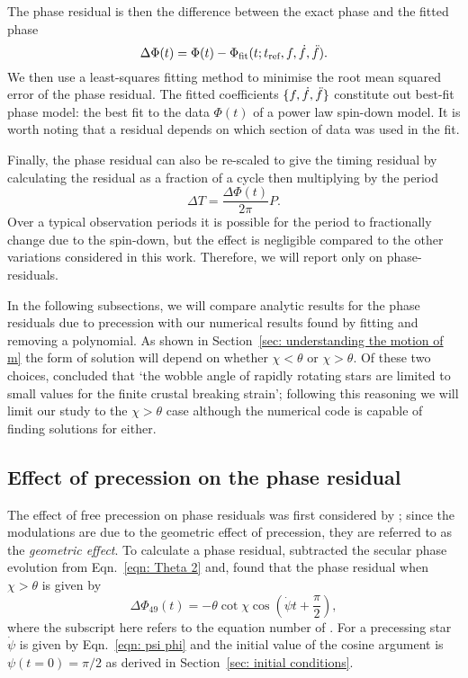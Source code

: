 \documentclass[../full_thesis/full_thesis.tex]{subfiles}
\begin{document}
The phase residual is then the difference between the exact phase
and the fitted phase
\begin{equation}
  \Delta\Phi(t) = \Phi(t) - \Phi_{\mathrm{fit}}(t; t_{\textrm{ref}}, f, \dot{f}, \ddot{f}).
\end{equation}
We then use a least-squares fitting method to minimise the root mean squared
error of the phase residual. The fitted coefficients $\{f, \dot{f},
\ddot{f}\}$ constitute out best-fit phase model: the best fit to the data
$\Phi(t)$ of a power law spin-down model.  It is worth noting that a residual
depends on which section of data was used in the fit.

Finally, the phase residual can also be re-scaled to give the timing residual by
calculating the residual as a fraction of a cycle then multiplying by the
period
\begin{equation}
    \Delta T = \frac{\Delta\Phi(t)}{2\pi} P.
    \label{eqn: phase to timing}
\end{equation}
Over a typical observation periods it is possible for the period to
fractionally change due to the spin-down, but the effect is negligible compared
to the other variations considered in this work. Therefore, we will report only
on phase-residuals.

In the following subsections, we will compare analytic results for the phase
residuals due to precession with our numerical results found by fitting and
removing a polynomial. As shown in Section~\ref{sec: understanding the motion of m}
the form of solution will depend on whether $\chi < \theta$ or $\chi > \theta$.
Of these two choices, \citet{Jones2001} concluded that `the wobble angle of
rapidly rotating stars are limited to small values for the finite crustal
breaking strain'; following this reasoning we will limit our study to the
$\chi > \theta$ case although the numerical code is capable of finding solutions
for either.

\subsection{Effect of precession on the phase residual}

The effect of free precession on phase residuals was first considered by
\citet{Nelson1990}; since the modulations are due to the geometric effect of
precession, they are referred to as the \emph{geometric effect}. To calculate a
phase residual, \citet{Jones2001} subtracted the secular phase evolution from
Eqn.~\ref{eqn: Theta 2} and, found that the phase residual when $\chi > \theta$
is given by
\begin{equation}
    \Delta\Phi_{49}(t) = -\theta \cot\chi\cos\left(\dot{\psi}t + \frac{\pi}{2}\right),
    \label{eqn: Jones 49}
\end{equation}
where the subscript here refers to the equation number of \citet{Jones2001}.
For a precessing star $\dot{\psi}$ is given by Eqn.~\eqref{eqn: psi phi} and
the initial value of the cosine argument is $\psi(t=0)=\pi/2$ as derived in
Section~\ref{sec: initial conditions}.
\end{document}
